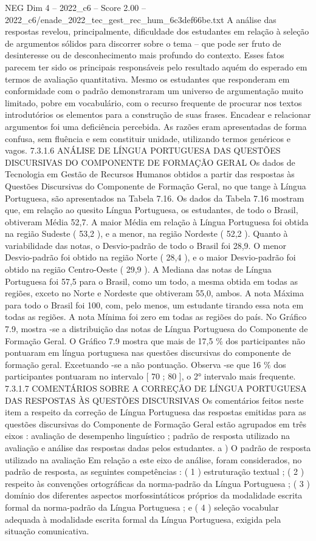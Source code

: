 \begin{textsample}{NEG Dim 4 – 2022\_c6 – Score 2.00 – 2022\_c6/enade\_2022\_tec\_gest\_rec\_hum\_6c3def66be.txt}
A análise das respostas revelou, principalmente, dificuldade dos estudantes em relação à seleção de argumentos sólidos para discorrer sobre o tema – que pode ser fruto de desinteresse ou de desconhecimento mais profundo do contexto.
Esses fatos parecem ter sido os principais responsáveis pelo resultado aquém do esperado em termos de avaliação quantitativa.
Mesmo os estudantes que responderam em conformidade com o padrão demonstraram um universo de argumentação muito limitado, pobre em vocabulário, com o recurso frequente de procurar nos textos introdutórios os elementos para a construção de suas frases.
Encadear e relacionar argumentos foi uma deficiência percebida.
As razões eram apresentadas de forma confusa, sem fluência e sem constituir unidade, utilizando termos genéricos e vagos. 7.3.1.6 ANÁLISE DE LÍNGUA PORTUGUESA DAS QUESTÕES DISCURSIVAS DO COMPONENTE DE FORMAÇÃO GERAL Os dados de Tecnologia em Gestão de Recursos Humanos obtidos a partir das respostas às Questões Discursivas do Componente de Formação Geral, no que tange à Língua Portuguesa, são apresentados na Tabela 7.16.
Os dados da Tabela 7.16 mostram que, em relação ao quesito Língua Portuguesa, os estudantes, de todo o Brasil, obtiveram Média 52,7.
A maior Média em relação à Língua Portuguesa foi obtida na região Sudeste ( 53,2 ), e a menor, na região Nordeste ( 52,2 ).
Quanto à variabilidade das notas, o Desvio-padrão de todo o Brasil foi 28,9.
O menor Desvio-padrão foi obtido na região Norte ( 28,4 ), e o maior Desvio-padrão foi obtido na região Centro-Oeste ( 29,9 ).
A Mediana das notas de Língua Portuguesa foi 57,5 para o Brasil, como um todo, a mesma obtida em todas as regiões, exceto no Norte e Nordeste que obtiveram 55,0, ambos.
A nota Máxima para todo o Brasil foi 100, com, pelo menos, um estudante tirando essa nota em todas as regiões.
A nota Mínima foi zero em todas as regiões do país.
No Gráfico 7.9, mostra -se a distribuição das notas de Língua Portuguesa do Componente de Formação Geral.
O Gráfico 7.9 mostra que mais de 17,5 \% dos participantes não pontuaram em língua portuguesa nas questões discursivas do componente de formação geral.
Excetuando -se a não pontuação.
Observa -se que 16 \% dos participantes pontuaram no intervalo [ 70 ; 80 ], o 2{\EmojiFont °} intervalo mais frequente. 7.3.1.7 COMENTÁRIOS SOBRE A CORREÇÃO DE LÍNGUA PORTUGUESA DAS RESPOSTAS ÀS QUESTÕES DISCURSIVAS Os comentários feitos neste item a respeito da correção de Língua Portuguesa das respostas emitidas para as questões discursivas do Componente de Formação Geral estão agrupados em três eixos : avaliação de desempenho linguístico ; padrão de resposta utilizado na avaliação e análise das respostas dadas pelos estudantes. a ) O padrão de resposta utilizado na avaliação Em relação a este eixo de análise, foram considerados, no padrão de resposta, as seguintes competências : ( 1 ) estruturação textual ; ( 2 ) respeito às convenções ortográficas da norma-padrão da Língua Portuguesa ; ( 3 ) domínio dos diferentes aspectos morfossintáticos próprios da modalidade escrita formal da norma-padrão da Língua Portuguesa ; e ( 4 ) seleção vocabular adequada à modalidade escrita formal da Língua Portuguesa, exigida pela situação comunicativa.

\end{textsample}

